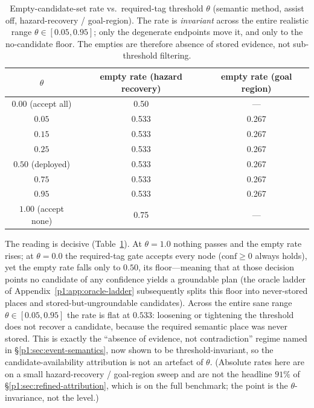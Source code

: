 \documentclass{article}
\begin{document}
\begin{table}[h]
\caption{Empty-candidate-set rate vs.\ required-tag threshold $\theta$ (semantic method, assist off, hazard-recovery / goal-region). The rate is \emph{invariant} across the entire realistic range $\theta\in[0.05,0.95]$; only the degenerate endpoints move it, and only to the no-candidate floor. The empties are therefore absence of stored evidence, not sub-threshold filtering.}
\label{p1:tab:theta-robustness}
\centering
\small
\begin{tabular}{c c c}
\toprule
$\theta$ & empty rate (hazard recovery) & empty rate (goal region) \\
\midrule
$0.00$ (accept all) & 0.50 & --- \\
$0.05$ & 0.533 & 0.267 \\
$0.15$ & 0.533 & 0.267 \\
$0.25$ & 0.533 & 0.267 \\
$0.50$ (deployed) & 0.533 & 0.267 \\
$0.75$ & 0.533 & 0.267 \\
$0.95$ & 0.533 & 0.267 \\
$1.00$ (accept none) & 0.75 & --- \\
\bottomrule
\end{tabular}
\end{table}

The reading is decisive (Table~\ref{p1:tab:theta-robustness}). At $\theta{=}1.0$ nothing passes and the empty rate rises; at $\theta{=}0.0$ the required-tag gate accepts every node ($\mathrm{conf}\ge 0$ always holds), yet the empty rate falls only to $0.50$, its floor---meaning that at those decision points no candidate of any confidence yields a groundable plan (the oracle ladder of Appendix~\ref{p1:app:oracle-ladder} subsequently splits this floor into never-stored places and stored-but-ungroundable candidates). Across the entire sane range $\theta\in[0.05,0.95]$ the rate is flat at $0.533$: loosening or tightening the threshold does not recover a candidate, because the required semantic place was never stored. This is exactly the ``absence of evidence, not contradiction'' regime named in \S\ref{p1:sec:event-semantics}, now shown to be threshold-invariant, so the candidate-availability attribution is not an artefact of $\theta$. (Absolute rates here are on a small hazard-recovery / goal-region sweep and are not the headline $91\%$ of \S\ref{p1:sec:refined-attribution}, which is on the full benchmark; the point is the $\theta$-invariance, not the level.)
\end{document}
